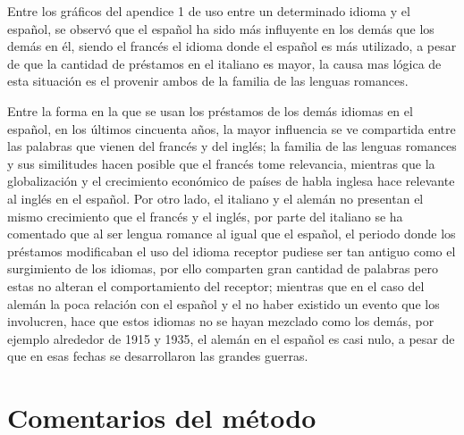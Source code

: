 Entre los gráficos del apendice 1 de uso entre un determinado idioma y el español, se observó que el español ha sido más influyente en los demás que los demás en él,  siendo el francés el idioma donde el español es más utilizado, a pesar de que la cantidad de préstamos en el italiano es mayor, la causa mas lógica  de esta situación es el provenir ambos de la familia de las lenguas romances. 

Entre la forma en la que se usan los préstamos de los demás idiomas en el español,  en los últimos cincuenta años, la mayor influencia se ve compartida entre las palabras que vienen del francés y  del inglés;  la familia de las lenguas romances y sus similitudes hacen posible que el francés tome relevancia, mientras que la globalización y el crecimiento económico de países de habla inglesa hace relevante al inglés en el español.   Por otro lado,  el italiano y el alemán  no presentan el mismo crecimiento que el francés y el inglés,  por parte del italiano se ha comentado que al ser lengua romance al igual que el español,  el periodo donde los préstamos modificaban el uso del idioma receptor pudiese ser tan antiguo como el surgimiento de los idiomas,  por ello comparten gran cantidad de palabras pero estas no alteran el comportamiento del receptor; mientras que en el caso del alemán la poca relación con el español y el no haber existido un evento que los involucren,  hace que estos idiomas no se hayan mezclado como los demás,  por ejemplo alrededor de 1915 y 1935,  el alemán en el español es casi nulo, a pesar de que en esas fechas se desarrollaron las grandes guerras.


\newpage
\section{Comentarios del método}

